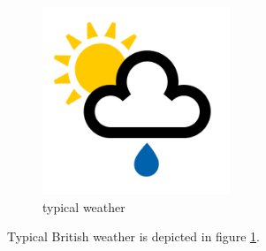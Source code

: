 \documentclass[12pt]{article}  %
\begin{document}
\begin{figure}[h]
	\centering
	\includegraphics[width=0.5\textwidth]{showers}
	\caption{typical weather}
	\label{fig:weather}
\end{figure}

Typical British weather is depicted in figure \ref{fig:weather}.
\end{document}
